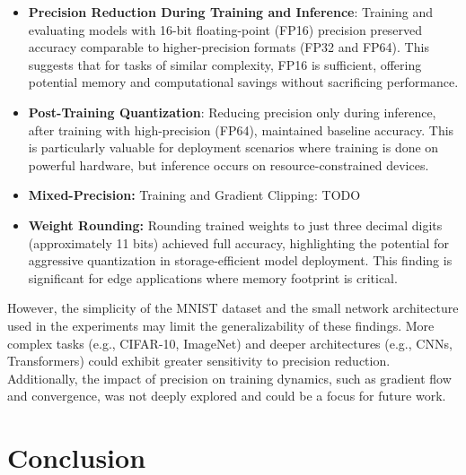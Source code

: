 \documentclass[11pt]{article}
\begin{document}
\begin{itemize}
	\item \textbf{Precision Reduction During Training and Inference}: Training and evaluating
	      models with 16-bit floating-point (FP16) precision preserved accuracy comparable to
	      higher-precision formats (FP32 and FP64). This suggests that for tasks of similar
	      complexity, FP16 is sufficient, offering potential memory and computational savings
	      without sacrificing performance.

	\item \textbf{Post-Training Quantization}: Reducing precision only during inference, after
	      training with high-precision (FP64), maintained baseline accuracy. This is
	      particularly valuable for deployment scenarios where training is done on powerful
	      hardware, but inference occurs on resource-constrained devices.

	\item \textbf{Mixed-Precision:} Training and Gradient Clipping: TODO

	\item \textbf{Weight Rounding:} Rounding trained weights to just three decimal digits
	      (approximately 11 bits) achieved full accuracy, highlighting the potential for
	      aggressive quantization in storage-efficient model deployment. This finding is
	      significant for edge applications where memory footprint is critical.
\end{itemize}

However, the simplicity of the MNIST dataset and the small network architecture
used in the experiments may limit the generalizability of these findings. More
complex tasks (e.g., CIFAR-10, ImageNet) and deeper architectures (e.g., CNNs,
Transformers) could exhibit greater sensitivity to precision reduction.
Additionally, the impact of precision on training dynamics, such as gradient
flow and convergence, was not deeply explored and could be a focus for future
work.

\section{Conclusion}

\end{document}
